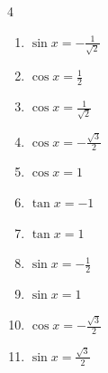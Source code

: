 \begin{multicols}{4}
\begin{enumerate}

  \item $\displaystyle \sin{x}  = -\frac{1}{\sqrt{2}}$


  \item $\displaystyle \cos{x}  = \frac{1}{2}$


  \item $\displaystyle \cos{x}  = \frac{1}{\sqrt{2}}$


  \item $\displaystyle \cos{x}  = -\frac{\sqrt{3}}{2}$


  \item $\displaystyle \cos{x}  = 1$


  \item $\displaystyle \tan{x}  = -1$


  \item $\displaystyle \tan{x}  = 1$


\columnbreak %

\resetques

  \item $\displaystyle \sin{x}  = -\frac{1}{2}$


  \item $\displaystyle \sin{x}  = 1$


  \item $\displaystyle \cos{x}  = -\frac{\sqrt{3}}{2}$


  \item $\displaystyle \sin{x}  = \frac{\sqrt{3}}{2}$


\end{enumerate}
\end{multicols}
